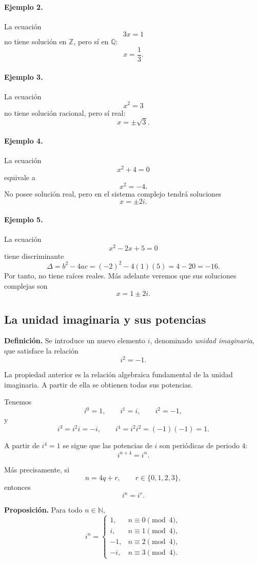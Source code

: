 \paragraph{Ejemplo 2.}
La ecuación
\[
3x=1
\]
no tiene solución en $\mathbb{Z}$, pero sí en $\mathbb{Q}$:
\[
x=\frac13.
\]

\paragraph{Ejemplo 3.}
La ecuación
\[
x^2=3
\]
no tiene solución racional, pero sí real:
\[
x=\pm\sqrt3.
\]

\paragraph{Ejemplo 4.}
La ecuación
\[
x^2+4=0
\]
equivale a
\[
x^2=-4.
\]
No posee solución real, pero en el sistema complejo tendrá soluciones
\[
x=\pm 2i.
\]

\paragraph{Ejemplo 5.}
La ecuación
\[
x^2-2x+5=0
\]
tiene discriminante
\[
\Delta=b^2-4ac=(-2)^2-4(1)(5)=4-20=-16.
\]
Por tanto, no tiene raíces reales. Más adelante veremos que sus soluciones
complejas son
\[
x=1\pm 2i.
\]

\subsection{La unidad imaginaria y sus potencias}

\textbf{Definición.}
Se introduce un nuevo elemento $i$, denominado \emph{unidad imaginaria}, que
satisface la relación
\[
\boxed{i^2=-1.}
\]

La propiedad anterior es la relación algebraica fundamental de la unidad
imaginaria. A partir de ella se obtienen todas sus potencias.

Tenemos
\[
i^0=1,
\qquad
i^1=i,
\qquad
i^2=-1,
\]
y
\[
i^3=i^2i=-i,
\qquad
i^4=i^2i^2=(-1)(-1)=1.
\]

A partir de $i^4=1$ se sigue que las potencias de $i$ son periódicas de
periodo $4$:
\[
\boxed{i^{n+4}=i^n.}
\]

Más precisamente, si
\[
n=4q+r,
\qquad r\in\{0,1,2,3\},
\]
entonces
\[
i^n=i^r.
\]

\textbf{Proposición.}
Para todo $n\in\mathbb{N}$,
\[
i^n=
\begin{cases}
1, & n\equiv 0 \pmod 4,\\
i, & n\equiv 1 \pmod 4,\\
-1, & n\equiv 2 \pmod 4,\\
-i, & n\equiv 3 \pmod 4.
\end{cases}
\]

